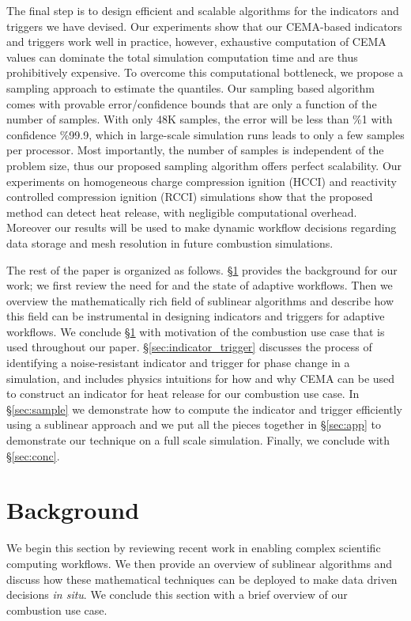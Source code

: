 \documentclass[final]{siamltex}
\newcommand{\Sec}[1]{\hyperref[sec:#1]{\S\ref*{sec:#1}}} \newcommand{\App}[1]{\hyperref[sec:#1]{Appendix~\ref*{sec:#1}}} \newcommand{\Eqn}[1]{\hyperref[eq:#1]{(\ref*{eq:#1})}} \newcommand{\Fig}[1]{\hyperref[fig:#1]{Fig.\,\ref*{fig:#1}}} \newcommand{\Tab}[1]{\hyperref[tab:#1]{Tab.\,\ref*{tab:#1}}} \newcommand{\Thm}[1]{\hyperref[thm:#1]{Thm.\,\ref*{thm:#1}}} \newcommand{\Lem}[1]{\hyperref[lem:#1]{Lem.\,\ref*{lem:#1}}} \newcommand{\Prop}[1]{\hyperref[prop:#1]{Prop.~\ref*{prop:#1}}} \newcommand{\Cor}[1]{\hyperref[cor:#1]{Cor.~\ref*{cor:#1}}} \newcommand{\Def}[1]{\hyperref[def:#1]{Defn.~\ref*{def:#1}}} \newcommand{\Ex}[1]{\hyperref[ex:#1]{Ex.~\ref*{ex:#1}}} \newcommand{\Clm}[1]{\hyperref[clm:#1]{Claim~\ref*{clm:#1}}} \newcommand{\Step}[1]{\hyperref[step:#1]{Step~\ref*{step:#1}}} \def\btodo{\color{red}}
\begin{document}
The final step is to design efficient and scalable algorithms for the
indicators and triggers we have devised. 
Our experiments show that our CEMA-based indicators and triggers work well in practice,  
however, exhaustive computation of CEMA values can dominate  the total
simulation computation time and are thus prohibitively expensive.  To overcome 
this computational bottleneck, we propose a sampling approach to estimate the quantiles.  
Our sampling based algorithm comes with provable error/confidence bounds  that are only 
a function of the number of samples.  With only 48K samples, the error will be less than \%1 
with confidence \%99.9, which in large-scale simulation runs leads to only a few 
samples per processor.  Most importantly, the number of samples is independent of 
the problem size, thus our proposed sampling algorithm offers perfect scalability.  
Our experiments on homogeneous charge compression ignition (HCCI)  and reactivity 
controlled compression ignition (RCCI) simulations show that  the proposed method 
can detect heat release, with negligible computational overhead. Moreover our results
will be used to make dynamic workflow decisions regarding data storage and mesh
resolution in future combustion simulations.  
  
The rest of the paper is organized as follows. \Sec{background}
provides the background for our work; we first review  the need  for and 
the state of adaptive workflows. Then we overview the mathematically rich 
field of sublinear algorithms and describe how this field can be 
instrumental in designing indicators and triggers for adaptive workflows.  
We conclude \Sec{background} with motivation of the combustion use case that is used
throughout our paper.
\Sec{indicator_trigger}
discusses the process of identifying a noise-resistant indicator and trigger
for  phase change in a simulation, and includes physics intuitions for how and
why CEMA can be used to construct an indicator for heat release for our
combustion use case. In \Sec{sample} we demonstrate how to compute 
the indicator and trigger efficiently using a sublinear approach and we put all the pieces together in \Sec{app} 
to demonstrate our technique on a full scale simulation. Finally, we
conclude with \Sec{conc}. 

\section{Background}
\label{sec:background} 
We begin this section  by reviewing recent work in enabling complex
scientific computing workflows. We then provide an overview of sublinear algorithms and 
discuss how these mathematical techniques can be deployed to make data driven
decisions \emph{in situ}. 
We conclude this section with a brief overview of our combustion use case.
\end{document}
